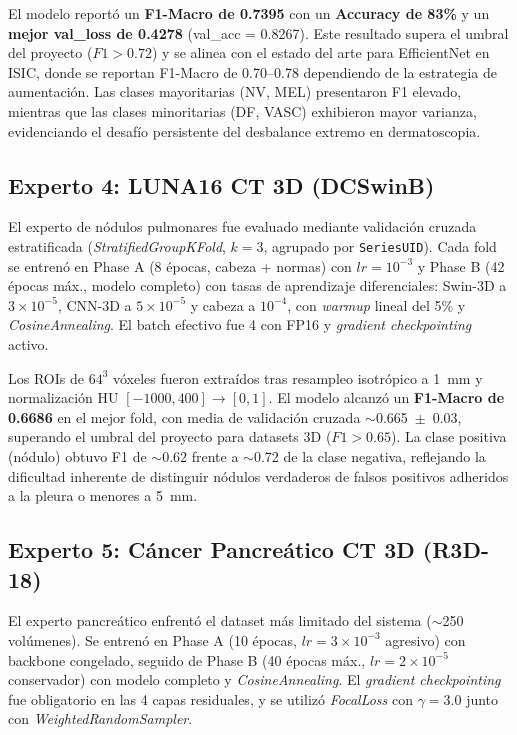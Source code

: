 \documentclass[conference, 11pt]{IEEEtran}
\begin{document}
El modelo reportó un \textbf{F1-Macro de 0.7395} con un \textbf{Accuracy de 83\%} y un \textbf{mejor val\_loss de 0.4278} (val\_acc = 0.8267). Este resultado supera el umbral del proyecto ($F1 > 0.72$) y se alinea con el estado del arte para EfficientNet en ISIC, donde se reportan F1-Macro de 0.70--0.78 dependiendo de la estrategia de aumentación. Las clases mayoritarias (NV, MEL) presentaron F1 elevado, mientras que las clases minoritarias (DF, VASC) exhibieron mayor varianza, evidenciando el desafío persistente del desbalance extremo en dermatoscopia.

\subsection{Experto 4: LUNA16 CT 3D (DCSwinB)}
El experto de nódulos pulmonares fue evaluado mediante validación cruzada estratificada (\textit{StratifiedGroupKFold}, $k=3$, agrupado por \texttt{SeriesUID}). Cada fold se entrenó en Phase A (8 épocas, cabeza + normas) con $lr=10^{-3}$ y Phase B (42 épocas máx., modelo completo) con tasas de aprendizaje diferenciales: Swin-3D a $3 \times 10^{-5}$, CNN-3D a $5 \times 10^{-5}$ y cabeza a $10^{-4}$, con \textit{warmup} lineal del 5\% y \textit{CosineAnnealing}. El batch efectivo fue 4 con FP16 y \textit{gradient checkpointing} activo.

Los ROIs de $64^3$ vóxeles fueron extraídos tras resampleo isotrópico a 1~mm y normalización HU $[-1000, 400] \rightarrow [0, 1]$. El modelo alcanzó un \textbf{F1-Macro de 0.6686} en el mejor fold, con media de validación cruzada $\sim$0.665~$\pm$~0.03, superando el umbral del proyecto para datasets 3D ($F1 > 0.65$). La clase positiva (nódulo) obtuvo F1 de $\sim$0.62 frente a $\sim$0.72 de la clase negativa, reflejando la dificultad inherente de distinguir nódulos verdaderos de falsos positivos adheridos a la pleura o menores a 5~mm.

\subsection{Experto 5: Cáncer Pancreático CT 3D (R3D-18)}
El experto pancreático enfrentó el dataset más limitado del sistema ($\sim$250 volúmenes). Se entrenó en Phase A (10 épocas, $lr=3 \times 10^{-3}$ agresivo) con backbone congelado, seguido de Phase B (40 épocas máx., $lr=2 \times 10^{-5}$ conservador) con modelo completo y \textit{CosineAnnealing}. El \textit{gradient checkpointing} fue obligatorio en las 4 capas residuales, y se utilizó \textit{FocalLoss} con $\gamma=3.0$ junto con \textit{WeightedRandomSampler}.
\end{document}
